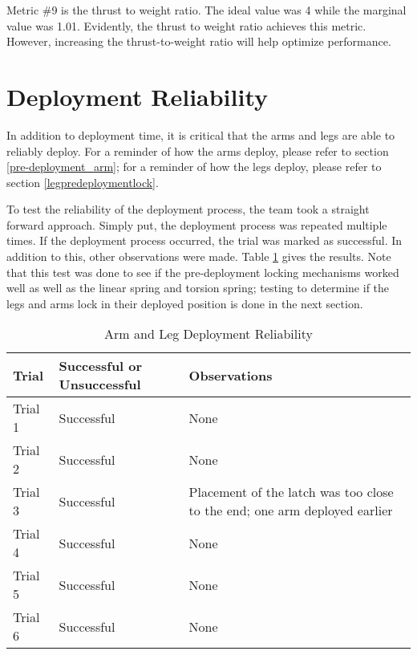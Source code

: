 Metric \#9 is the thrust to weight ratio. The ideal value was 4 while the marginal value was 1.01. Evidently, the thrust to weight ratio achieves this metric. However, increasing the thrust-to-weight ratio will help optimize performance.

\section{Deployment Reliability}
In addition to deployment time, it is critical that the arms and legs are able to reliably deploy. For a reminder of how the arms deploy, please refer to section \ref{pre-deployment_arm}; for a reminder of how the legs deploy, please refer to section \ref{legpredeploymentlock}.

To test the reliability of the deployment process, the team took a straight forward approach. Simply put, the deployment process was repeated multiple times. If the deployment process occurred, the trial was marked as successful. In addition to this, other observations were made. Table \ref{table:armdeploymentreliability} gives the results. Note that this test was done to see if the pre-deployment locking mechanisms worked well as well as the linear spring and torsion spring; testing to determine if the legs and arms lock in their deployed position is done in the next section.

\begin{table}[H]
\centering
\caption{Arm and Leg Deployment Reliability}
\label{table:armdeploymentreliability}
\begin{tabular}{|
>{\raggedright\arraybackslash}p{}|
>{\raggedright\arraybackslash}p{}|
>{\raggedright\arraybackslash}p{}|
}
    \hline
     \textbf{Trial} & \textbf{Successful or Unsuccessful } & \textbf{Observations}
    \\\hline 
     Trial 1 & Successful & {None}
     \\\hline 
     Trial 2 & Successful & {None}
     \\\hline
     Trial 3 & Successful & {Placement of the latch was too close to the end; one arm deployed earlier}
     \\\hline
    Trial 4 & Successful & {None}
     \\\hline
    Trial 5 & Successful & {None}
    \\\hline
    Trial 6 & Successful & {None}
    \\\hline
\end{tabular}
\end{table}

